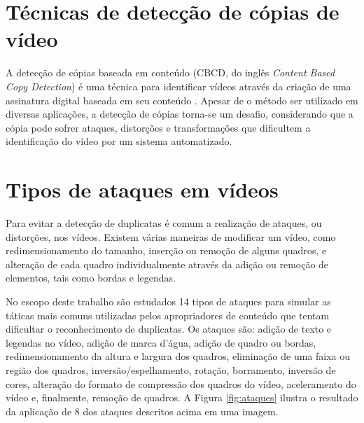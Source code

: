 

\section{Técnicas de detecção de cópias de vídeo}
    A detecção de cópias baseada em conteúdo (CBCD, do inglês \textit{Content Based Copy Detection}) é uma técnica para identificar vídeos através da criação de uma assinatura digital baseada em seu conteúdo \cite{jiang2011pku}. Apesar de o método ser utilizado em diversas aplicações, a detecção de cópias torna-se um desafio, considerando que a cópia pode sofrer ataques, distorções e transformações que dificultem a identificação do vídeo por um sistema automatizado.


\section{Tipos de ataques em vídeos}
\label{sec:ataques}

	Para evitar a detecção de duplicatas é comum a realização de ataques, ou distorções, nos vídeos. Existem várias maneiras de modificar um vídeo, como redimensionamento do tamanho, inserção ou remoção de alguns quadros, e alteração de cada quadro individualmente através da adição ou remoção de elementos, tais como bordas e legendas.

	No escopo deste trabalho são estudados 14 tipos de ataques para simular as táticas mais comuns utilizadas pelos apropriadores de conteúdo que tentam dificultar o reconhecimento de duplicatas. Os ataques são: adição de texto e legendas no vídeo, adição de marca d'água, adição de quadro ou bordas, redimensionamento da altura e largura dos quadros, eliminação de uma faixa ou região dos quadros, inversão/espelhamento, rotação, borramento, inversão de cores, alteração do formato de compressão dos quadros do vídeo, aceleramento do vídeo e, finalmente, remoção de quadros. A Figura \ref{fig:ataques} ilustra o resultado da aplicação de 8 dos ataques descritos acima em uma imagem.

